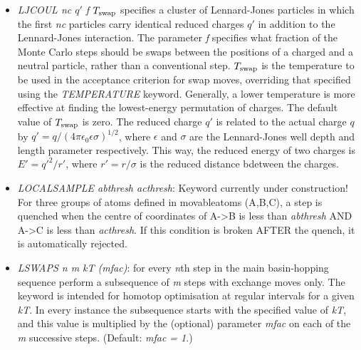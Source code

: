 \documentclass[12pt,a4paper,dvips]{article}
\begin{document}
\begin{itemize}
\item {\it LJCOUL nc $q'$ f $T_{\rm swap}$} specifies a cluster of Lennard-Jones particles in which the first {\it nc}
particles carry identical reduced charges {\it $q'$} in addition to the Lennard-Jones interaction.
The parameter {\it f} specifies what fraction of the Monte Carlo steps should be swaps between the
positions of a charged and a neutral particle, rather than a conventional step.
$T_{\rm swap}$ is the temperature to be used in the acceptance criterion for swap moves, overriding
that specified using the {\it TEMPERATURE} keyword.  Generally, a lower temperature is more effective
at finding the lowest-energy permutation of charges.  The default value of $T_{\rm swap}$ is zero.
The reduced charge $q'$ is related to the actual charge $q$ by $q'=q/(4\pi\epsilon_0\epsilon\sigma)^{1/2}$,
where $\epsilon$ and $\sigma$ are the Lennard-Jones well depth and length parameter respectively.
This way, the reduced energy of two charges is $E'=q'^2/r'$, where $r'=r/\sigma$ is the reduced distance
bdetween the charges.

\item {\it LOCALSAMPLE abthresh acthresh\/}: Keyword currently under construction! For three groups of atoms defined in movableatoms
(A,B,C), a step is quenched when the centre of coordinates of A->B is less than {\it abthresh} AND A->C is less than {\it acthresh}. 
If this condition is broken AFTER the quench, it is automatically rejected.

\item {\it LSWAPS n m kT (mfac)\/}: for every {\it n}th step in the main basin-hopping sequence perform a subsequence of {\it m} steps with exchange moves only. The keyword is intended for homotop optimisation at regular intervals for a given {\it kT}. In every instance the subsequence starts with the specified value of {\it kT}, and this value is multiplied by the (optional) parameter {\it mfac} on each of the {\it m} successive steps. (Default: {\it mfac = 1}.)


\end{itemize}
\end{document}
